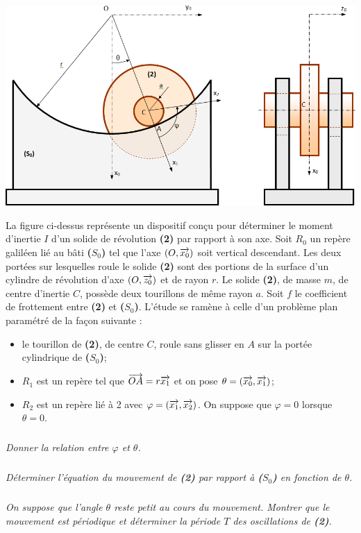 \documentclass[10pt,fleqn]{article} %
\begin{document}
\def\pathfig{images}

\vspace{5cm}
\pagestyle{fancy}
\thispagestyle{plain}

\def\columnseprulecolor{\color{ocre}}
\setlength{\columnseprule}{0.4pt} 

\def\pathfig{images}

\ifprof
\else
\begin{multicols}{2}
\fi




\begin{center}
\includegraphics[width=\linewidth]{images/fig_01}
\end{center}

La figure ci-dessus représente un dispositif conçu pour déterminer le moment d'inertie $I$ d'un solide de révolution \textbf{(2)} par rapport à son axe. Soit $R_0$ un repère galiléen lié au bâti \textbf{($S_0$)} tel que l'axe $\left(O,\overrightarrow{x_0}\right)$ soit vertical descendant. Les deux portées sur lesquelles roule le solide \textbf{(2)} sont des portions de la surface d'un cylindre de révolution d'axe $\left(O,\overrightarrow{z_0}\right)$ et de rayon $r$.
Le solide \textbf{(2)}, de masse $m$, de centre d'inertie $C$, possède deux tourillons de même rayon $a$. Soit $f$ le coefficient de frottement entre \textbf{(2)} et \textbf{($S_0$)}.
L'étude se ramène à celle d'un problème plan paramétré de la façon suivante :
\begin{itemize}
\item le tourillon de \textbf{(2)}, de centre $C$, roule sans glisser en $A$ sur la portée cylindrique de \textbf{($S_0$)};
\item $R_1$ est un repère tel que $\overrightarrow{OA} = r\overrightarrow{x_1}$ et on pose $\theta=\left(\overrightarrow{x_0},\overrightarrow{x_1}\right)$;
\item $R_2$ est un repère lié à 2 avec $\varphi=\left(\overrightarrow{x_1},\overrightarrow{x_2}\right)$. On suppose que $\varphi = 0$ lorsque $\theta=0$.
\end{itemize}
\subparagraph{}\textit{Donner la relation entre $\varphi$ et $\theta$.}
\subparagraph{}\textit{Déterminer l'équation du mouvement de \textbf{(2)} par rapport à \textbf{($S_0$)} en fonction de $\theta$.}
\subparagraph{}\textit{On suppose que l'angle $\theta$ reste petit au cours du mouvement. Montrer que le mouvement est périodique et déterminer la période $T$ des oscillations de \textbf{(2)}.}


\end{multicols}
\end{document}

